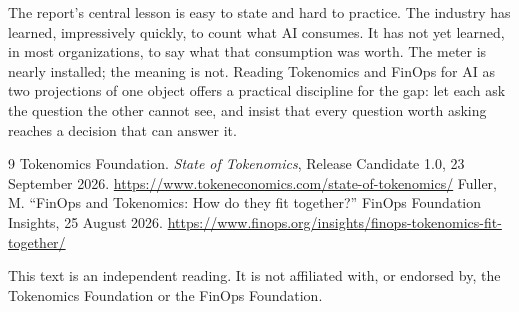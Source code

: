 \documentclass[11pt,a4paper]{article}
\begin{document}
The report's central lesson is easy to state and hard to practice. The industry has learned, impressively quickly, to count what AI consumes. It has not yet learned, in most organizations, to say what that consumption was worth. The meter is nearly installed; the meaning is not. Reading Tokenomics and FinOps for AI as two projections of one object offers a practical discipline for the gap: let each ask the question the other cannot see, and insist that every question worth asking reaches a decision that can answer it.

\begin{thebibliography}{9}\small
{} Tokenomics Foundation. \emph{State of Tokenomics}, Release Candidate 1.0, 23 September 2026. \url{https://www.tokeneconomics.com/state-of-tokenomics/}
 Fuller, M. ``FinOps and Tokenomics: How do they fit together?'' FinOps Foundation Insights, 25 August 2026. \url{https://www.finops.org/insights/finops-tokenomics-fit-together/}
\end{thebibliography}

\vfill
\begin{center}
\footnotesize\color{muted}
This text is an independent reading. It is not affiliated with, or endorsed by, the Tokenomics Foundation or the FinOps Foundation.
\end{center}
\end{document}
